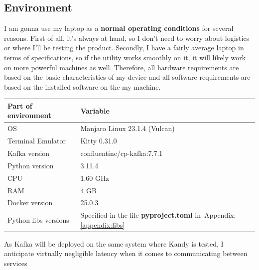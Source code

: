\documentclass[10pt , a4paper]{report}
\begin{document}
\subsection{Environment}
    I am gonna use my laptop as a \textbf{normal operating conditions} for several reasons. First of all, it's always at hand, so I don't need to worry about logistics or where I'll be testing the product. Secondly, I have a fairly average laptop in terms of specifications, so if the utility works smoothly on it, it will likely work on more powerful machines as well. Therefore, all hardware requirements are based on the basic characteristics of my device and all software requirements are based on the installed software on the my machine.

\begin{table}[h!tbp]
\centering
\begin{tabular}{| l | l |}
\hline
\textbf{Part of environment} & \textbf{Variable} \\
\hline
OS & Manjaro Linux 23.1.4 (Vulcan) \\
\hline
Terminal Emulator & Kitty 0.31.0 \\
\hline
Kafka version & confluentinc/cp-kafka:7.7.1\\
\hline
Python version & 3.11.4 \\
\hline
CPU & 1.60 GHz \\
\hline
RAM & 4 GB \\
\hline
Docker version & 25.0.3 \\
\hline
Python libs versions & Specified in the file \textbf{pyproject.toml} in~Appendix:\ref{appendix:libs} \\
\hline

\end{tabular}

\end{table}
As Kafka will be deployed on the same system where Kandy is tested, I anticipate virtually negligible latency when it comes to communicating between services

\newpage
\end{document}
